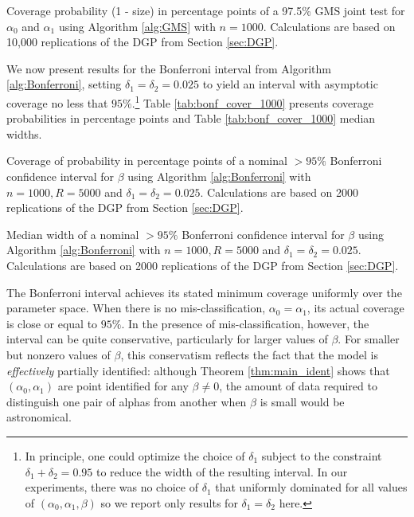 \begin{table}
  \small
  \centering
  
  \caption{Coverage probability (1 - size) in percentage points of a 97.5\% GMS joint test for $\alpha_0$ and $\alpha_1$ using Algorithm \ref{alg:GMS} with $n = 1000$. Calculations are based on 10,000 replications of the DGP from Section \ref{sec:DGP}.}
  \label{tab:alphas_cover_97point5_1000}
\end{table}

We now present results for the Bonferroni interval from Algorithm \ref{alg:Bonferroni}, setting $\delta_1 = \delta_2 = 0.025$ to yield an interval with asymptotic coverage no less that $95\%$.\footnote{In principle, one could optimize the choice of $\delta_1$ subject to the constraint $\delta_1 + \delta_2 = 0.95$ to reduce the width of the resulting interval. In our experiments, there was no choice of $\delta_1$ that uniformly dominated for all values of $(\alpha_0, \alpha_1, \beta)$ so we report only results for $\delta_1 = \delta_2$ here.}
Table \ref{tab:bonf_cover_1000} presents coverage probabilities in percentage points and Table \ref{tab:bonf_cover_1000} median widths.

\begin{table}[htbp]
  \centering
  \small
  
  \caption{Coverage of probability in percentage points of a nominal $>95\%$ Bonferroni confidence interval for $\beta$ using Algorithm \ref{alg:Bonferroni} with $n = 1000, R = 5000$ and $\delta_1 = \delta_2 = 0.025$. Calculations are based on 2000 replications of the DGP from Section \ref{sec:DGP}.}
  \label{tab:bonf_cover_1000}
\end{table}

\begin{table}
  \small
  \centering
  
  \caption{Median width of a nominal $>95\%$ Bonferroni confidence interval for $\beta$ using Algorithm \ref{alg:Bonferroni} with $n = 1000, R = 5000$ and $\delta_1 = \delta_2 = 0.025$. Calculations are based on 2000 replications of the DGP from Section \ref{sec:DGP}.}
  \label{tab:bonf_width_1000}
\end{table}

The Bonferroni interval achieves its stated minimum coverage uniformly over the parameter space.
When there is no mis-classification, $\alpha_0 = \alpha_1$, its actual coverage is close or equal to $95\%$.
In the presence of mis-classification, however, the interval can be quite conservative, particularly for larger values of $\beta$.
For smaller but nonzero values of $\beta$, this conservatism reflects the fact that the model is \emph{effectively} partially identified: although Theorem \ref{thm:main_ident} shows that $(\alpha_0, \alpha_1)$ are point identified for any $\beta\neq 0$, the amount of data required to distinguish one pair of alphas from another when $\beta$ is small would be astronomical.

